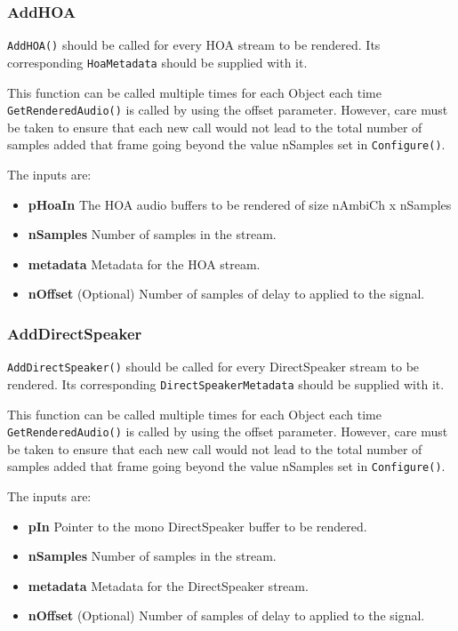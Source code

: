 \documentclass[12pt]{report}
\newcommand{\code}[1]{\texttt{#1}}
\begin{document}
\subsubsection{AddHOA}

\code{AddHOA()} should be called for every HOA stream to be rendered. Its corresponding \code{HoaMetadata} should be supplied with it.

This function can be called multiple times for each Object each time \code{GetRenderedAudio()} is called by using the offset parameter.
However, care must be taken to ensure that each new call would not lead to the total number of samples added that frame going beyond the value nSamples set in \code{Configure()}.

The inputs are:
\begin{itemize}
    \item \textbf{pHoaIn} The HOA audio buffers to be rendered of size nAmbiCh x nSamples
    \item \textbf{nSamples} Number of samples in the stream.
    \item \textbf{metadata} Metadata for the HOA stream.
    \item \textbf{nOffset} (Optional) Number of samples of delay to applied to the signal.
\end{itemize}

\subsubsection{AddDirectSpeaker}

\code{AddDirectSpeaker()} should be called for every DirectSpeaker stream to be rendered. Its corresponding \code{DirectSpeakerMetadata} should be supplied with it.

This function can be called multiple times for each Object each time \code{GetRenderedAudio()} is called by using the offset parameter.
However, care must be taken to ensure that each new call would not lead to the total number of samples added that frame going beyond the value nSamples set in \code{Configure()}.

The inputs are:
\begin{itemize}
    \item \textbf{pIn} Pointer to the mono DirectSpeaker buffer to be rendered.
    \item \textbf{nSamples} Number of samples in the stream.
    \item \textbf{metadata} Metadata for the DirectSpeaker stream.
    \item \textbf{nOffset} (Optional) Number of samples of delay to applied to the signal.
\end{itemize}
\end{document}
